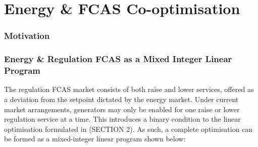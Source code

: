 \chapter{Energy \& FCAS Co-optimisation}

\subsection{Motivation}

\subsection{Energy \& Regulation FCAS as a Mixed Integer Linear Program}
The regulation FCAS market consists of both raise and lower services, offered as a deviation from the setpoint dictated by the energy market. Under current market arrangements, generators may only be enabled for one raise or lower regulation service at a time. This introduces a binary condition to the linear optimisation formulated in (SECTION 2). As such, a complete optimisation can be formed as a mixed-integer linear program shown below:

